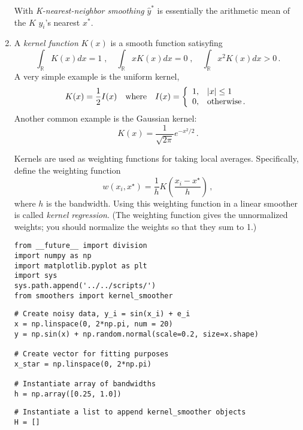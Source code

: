 \documentclass[10pt]{article}
\begin{document}
\begin{enumerate}[label=(\Alph*)]
        With \textit{K-nearest-neighbor smoothing} $\hat{y}^*$ is essentially the arithmetic mean of the $K$ $y_i$'s nearest $x^*$. 

      \item A \textit{kernel function} $K(x)$ is a smooth function satisyfing
        $$
        \int_\mathbb{R} K(x) dx = 1 \; , \quad \int_\mathbb{R} x K(x) dx = 0 \; , \quad \int_\mathbb{R} x^2 K(x) dx > 0 \, .
        $$
        A very simple example is the uniform kernel,
        $$
        K(x) = \frac{1}{2} I(x) \quad \mbox{where} \quad I(x) = 
        \left\{
        \begin{array}{l l}
        1, & |x| \leq 1 \\
        0, & \mbox{otherwise} \, . \\
        \end{array}
        \right.
        $$
        Another common example is the Gaussian kernel:
        $$
        K(x) = \frac{1}{\sqrt{2 \pi}} e^{-x^2/2} \, .
        $$

        Kernels are used as weighting functions for taking local averages.  Specifically, define the weighting function
        $$
        w(x_i, x^{\star}) = \frac{1}{h} K \left( \frac{x_i - x^{\star}}{h} \right)  \, ,
        $$
        where $h$ is the bandwidth.    Using this weighting function in a linear smoother is called \textit{kernel regression}.  (The weighting function gives the unnormalized weights; you should normalize the weights so that they sum to 1.)

        \begin{lstlisting}
from __future__ import division
import numpy as np 
import matplotlib.pyplot as plt
import sys
sys.path.append('../../scripts/')
from smoothers import kernel_smoother
        \end{lstlisting}

        \begin{lstlisting}
# Create noisy data, y_i = sin(x_i) + e_i
x = np.linspace(0, 2*np.pi, num = 20)
y = np.sin(x) + np.random.normal(scale=0.2, size=x.shape)

# Create vector for fitting purposes
x_star = np.linspace(0, 2*np.pi)

# Instantiate array of bandwidths
h = np.array([0.25, 1.0])
        \end{lstlisting}

        \begin{lstlisting}
# Instantiate a list to append kernel_smoother objects
H = []


\end{lstlisting}
\end{enumerate}
\end{document}
